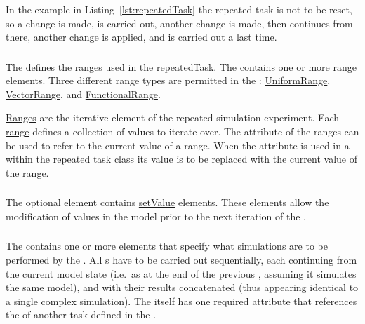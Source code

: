 In the example in  Listing~\ref{lst:repeatedTask} the repeated task is not to be reset, so a change is made,  is carried out, another change is made, then  continues from there, another change is applied, and  is carried out a last time.

\subsubsection{}
\label{sec:ranges}
The  defines the \hyperref[class:range]{ranges} used in the \hyperref[class:repeatedTask]{repeatedTask}. The  contains one or more \hyperref[class:range]{range} elements. Three different range types are permitted in the : \hyperref[class:uniformRange]{UniformRange}, \hyperref[class:vectorRange]{VectorRange}, and \hyperref[class:functionalRange]{FunctionalRange}.

\hyperref[class:range]{Ranges} are the iterative element of the repeated simulation experiment. Each \hyperref[class:range]{range} defines a collection of values to iterate over. The  attribute of the ranges can be used to refer to the current value of a range. When the  attribute is used in a  within the repeated task class its value is to be replaced with the current value of the range.

\subsubsection{}
\label{sec:changes}
The optional  element contains \hyperref[class:setValue]{setValue} elements. These elements allow the modification of values in the model prior to the next iteration of the .

\subsubsection{}
\label{class:subTask}
The  contains one or more  elements that specify what simulations are to be performed by the .
All s have to be carried out sequentially, each continuing from the current model state (i.e.\ as at the end of the previous , assuming it simulates the same model), and with their results concatenated (thus appearing identical to a single complex simulation). The  itself has one required attribute  that references the  of another task defined in the .

